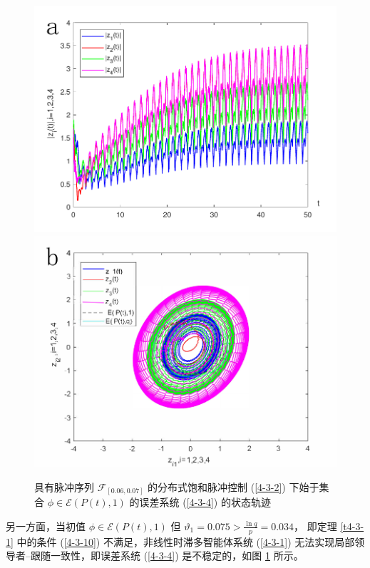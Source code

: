 \begin{figure}[H]
    \centering
    \includegraphics[scale=0.5]{./ch4/fig4-12-1.pdf}
    \includegraphics[scale=0.5]{./ch4/fig4-12-2.pdf} 
    \caption{具有脉冲序列 $\mathscr{F}_{[0.06,0.07]}$ 的分布式饱和脉冲控制 (\ref{4-3-2}) 下始于集合 $\phi\in \mathscr{E}( P(t),1)$ 的误差系统 (\ref{4-3-4}) 的状态轨迹}
    \label{f4-12}
\end{figure} 
另一方面，当初值 $\phi\in \mathscr{E}( P(t),1)$ 但 $\vartheta_1=0.075>\frac{\ln q}{p}=0.034$， 即定理 \ref{t4-3-1} 中的条件 (\ref{4-3-10}) 不满足，非线性时滞多智能体系统 (\ref{4-3-1}) 无法实现局部领导者--跟随一致性，即误差系统 (\ref{4-3-4}) 是不稳定的，如图 \ref{f4-12} 所示。


